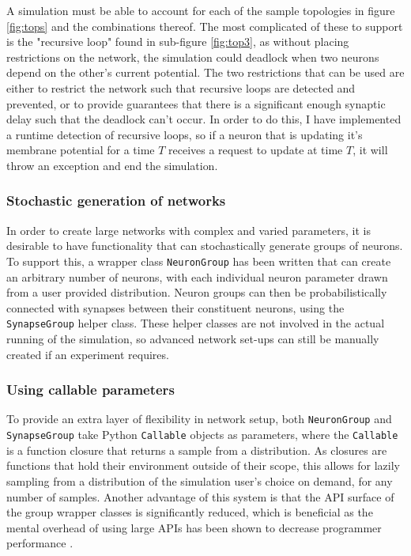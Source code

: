 A simulation must be able to account for each of the sample topologies in figure
\ref{fig:tops} and the combinations thereof. The most complicated of these to
support is the "recursive loop" found in sub-figure \ref{fig:top3}, as without
placing restrictions on the network, the simulation could deadlock when two
neurons depend on the other's current potential. The two restrictions that can
be used are either to restrict the network such that recursive loops are
detected and prevented, or to provide guarantees that there is a significant
enough synaptic delay such that the deadlock can't occur. In order to do this, I
have implemented a runtime detection of recursive loops, so if a neuron that is
updating it's membrane potential for a time $T$ receives a request to update at
time $T$, it will throw an exception and end the simulation. 

\subsubsection{Stochastic generation of networks}

In order to create large networks with complex and varied parameters, it is
desirable to have functionality that can stochastically generate groups of
neurons. To support this, a wrapper class \texttt{NeuronGroup} has been written
that can create an arbitrary number of neurons, with each individual neuron
parameter drawn from a user provided distribution. Neuron groups can then be
probabilistically connected with synapses between their constituent neurons,
using the \texttt{SynapseGroup} helper class. These helper classes are not
involved in the actual running of the simulation, so advanced network set-ups
can still be manually created if an experiment requires.

\subsubsection{Using callable parameters}

To provide an extra layer of flexibility in network setup, both
\texttt{NeuronGroup} and \texttt{SynapseGroup} take Python \texttt{Callable}
objects as parameters, where the \texttt{Callable} is a function closure that
returns a sample from a distribution. As closures are functions that hold their
environment outside of their scope, this allows for lazily sampling from a distribution of the simulation user's choice on demand, for any
number of samples. Another advantage of this system is that the API surface of
the group wrapper classes is significantly reduced, which is beneficial as the
mental overhead of using large APIs has been shown to decrease programmer
performance \autocite{ellis_factory_2007,omar_active_2012}.